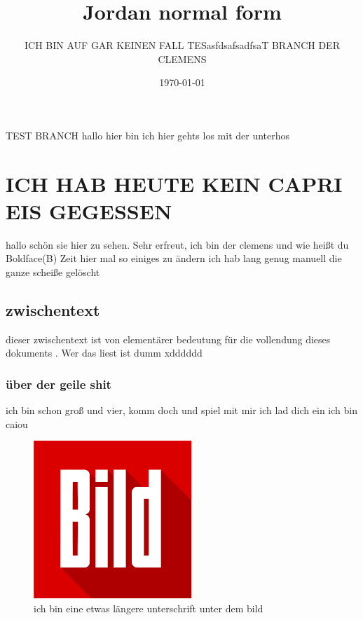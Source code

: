 \documentclass[a4paper]{scrartcl}
\title{Jordan normal form}
\author{ICH BIN AUF GAR KEINEN FALL TESasfdsafsadfsaT BRANCH  DER CLEMENS}
\date{\today}
\begin{document}
	\maketitle
	\tableofcontents
	\newpage
	TEST BRANCH hallo hier bin ich
	hier gehts los mit der unterhos
		\section{ICH HAB HEUTE KEIN CAPRI EIS GEGESSEN}
			hallo schön sie hier zu sehen. Sehr erfreut, ich bin der clemens und wie heißt du
			Boldface(B)
			Zeit hier mal so einiges zu ändern ich hab lang genug manuell die ganze scheiße gelöscht

			\subsection{zwischentext}
			dieser zwischentext ist von elementärer bedeutung für die vollendung dieses dokuments . Wer das liest ist dumm xdddddd
				\subsubsection{über der geile shit}
				ich bin schon groß und vier, komm doch und spiel mit mir ich lad dich ein ich bin\label{eins} caiou \vspace{40pt}

				\begin{figure}[h]
					\centering
					\includegraphics[width=0.7\linewidth]{download.png}
					\caption[ich bin eine sehr kurze unterschrift von dem bild]{ich bin eine etwas längere unterschrift unter dem bild}
					\label{fig:wallpaper}
				\end{figure}
				\pagebreak
\end{document}
